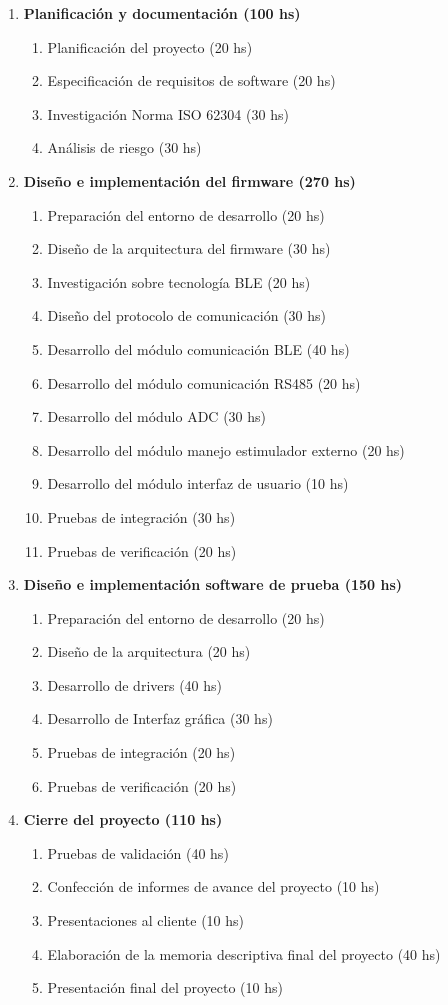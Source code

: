 \documentclass[
11pt, %
codirector, %
]{charter}
\begin{document}
\begin{enumerate}
\item \textbf{Planificación y documentación (100 hs)}
	\begin{enumerate}
	\item Planificación del proyecto (20 hs)
	\item Especificación de requisitos de software (20 hs)
	\item Investigación Norma ISO 62304 (30 hs)
	\item Análisis de riesgo (30 hs)
	\end{enumerate}
\item \textbf{Diseño e implementación del firmware (270 hs)}
	\begin{enumerate}
	\item Preparación del entorno de desarrollo (20 hs)
	\item Diseño de la arquitectura del firmware  (30 hs)
	\item Investigación sobre tecnología BLE (20 hs)	
	\item Diseño del protocolo de comunicación (30 hs)
	\item Desarrollo del módulo comunicación BLE (40 hs)
	\item Desarrollo del módulo comunicación RS485 (20 hs)
	\item Desarrollo del módulo ADC (30 hs)
	\item Desarrollo del módulo manejo estimulador externo (20 hs)
	\item Desarrollo del módulo interfaz de usuario (10 hs)
	\item Pruebas de integración (30 hs)
	\item Pruebas de verificación (20 hs)
	\end{enumerate}
\item \textbf{Diseño e implementación software de prueba (150 hs)}
	\begin{enumerate}
	\item Preparación del entorno de desarrollo (20 hs)
	\item Diseño de la arquitectura (20 hs)
	\item Desarrollo de drivers (40 hs)
	\item Desarrollo de Interfaz gráfica (30 hs)
	\item Pruebas de integración (20 hs)
	\item Pruebas de verificación (20 hs)
	\end{enumerate}
\item \textbf{Cierre del proyecto (110 hs)}
	\begin{enumerate}
	\item Pruebas de validación (40 hs)
	\item Confección de informes de avance del proyecto (10 hs)
	\item Presentaciones al cliente (10 hs)
	\item Elaboración de la memoria descriptiva final del proyecto  (40 hs)
	\item Presentación final del proyecto (10 hs)
	\end{enumerate}
\end{enumerate}
\end{document}
